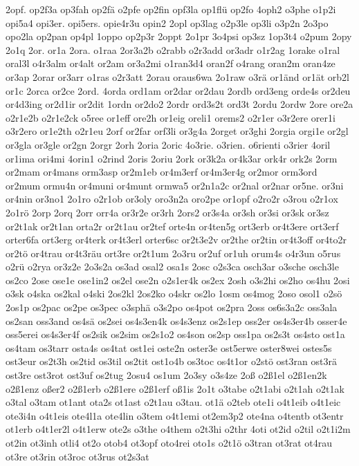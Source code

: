 {2opf.
op2f3a
op3fah
op2fä
o2pfe
op2fin
opf3la
op1flü
op2fo
4oph2
o3phe
o1p2i
opi5a4
opi3er.
opi5ers.
opie4r3u
opin2
2opl
op3lag
o2p3le
op3li
o3p2n
2o3po
opo2la
op2pan
op4pl
1oppo
op2p3r
2oppt
2o1pr
3o4psi
op3sz
1op3t4
o2pum
2opy
2o1q
2or.
or1a
2ora.
o1raa
2or3a2b
o2rabb
o2r3add
or3adr
o1r2ag
1orake
o1ral
oral3l
o4r3alm
or4alt
or2am
or3a2mi
o1ran3d4
oran2f
o4rang
oran2m
oran4ze
or3ap
2orar
or3arr
o1ras
o2r3att
2orau
oraus6wa
2o1raw
o3rä
or1änd
or1ät
orb2l
or1c
2orca
or2ce
2ord.
4orda
ord1am
or2dar
or2dau
2ordb
ord3eng
orde4s
or2deu
or4d3ing
or2d1ir
or2dit
1ordn
or2do2
2ordr
ord3s2t
ord3t
2ordu
2ordw
2ore
ore2a
o2r1e2b
o2r1e2ck
o5ree
or1eff
ore2h
or1eig
oreli1
orems2
o2r1er
o3r2ere
orer1i
o3r2ero
or1e2th
o2r1eu
2orf
or2far
orf3li
or3g4a
2orget
or3ghi
2orgia
orgi1e
or2gl
or3gla
or3gle
or2gn
2orgr
2orh
2oria
2oric
4o3rie.
o3rien.
o6rienti
o3rier
4oril
or1ima
ori4mi
4orin1
o2rind
2oris
2oriu
2ork
or3k2a
or4k3ar
ork4r
ork2s
2orm
or2mam
or4mans
orm3asp
or2m1eb
or4m3erf
or4m3er4g
or2mor
orm3ord
or2mum
ormu4n
or4muni
or4munt
ormwa5
or2n1a2c
or2nal
or2nar
or5ne.
or3ni
or4nin
or3no1
2o1ro
o2r1ob
or3oly
oro3n2a
oro2pe
or1opf
o2ro2r
o3rou
o2r1ox
2o1rö
2orp
2orq
2orr
orr4a
or3r2e
or3rh
2ors2
or3s4a
or3sh
or3si
or3sk
or3sz
or2t1ak
or2t1an
orta2r
or2t1au
or2tef
orte4n
or4ten5g
ort3erb
or4t3ere
ort3erf
orter6fa
ort3erg
or4terk
or4t3erl
orter6sc
or2t3e2v
or2the
or2tin
or4t3off
or4to2r
or2tö
or4trau
or4t3räu
ort3re
or2t1um
2o3ru
or2uf
or1uh
orum4s
o4r3un
o5rus
o2rü
o2rya
or3z2e
2o3s2a
os3ad
osal2
osa1s
2osc
o2s3ca
osch3ar
o3sche
osch3le
os2co
2ose
ose1e
ose1in2
os2el
ose2n
o2s1er4k
os2ex
2osh
o3s2hi
os2ho
os4hu
2osi
o3sk
o4ska
os2kal
o4ski
2os2kl
2os2ko
o4skr
os2lo
1osm
os4mog
2oso
osol1
o2sö
2os1p
os2pac
os2pe
os3pec
o3sphä
o3s2po
os4pot
os2pra
2oss
os6s3a2c
oss3ala
os2san
oss3and
os4sä
os2sei
os4s3en4k
os4s3enz
os2s1ep
oss2er
os4s3er4b
osser4e
oss5erei
os4s3er4f
os2sik
os2sim
os2s1o2
os4son
os2sp
oss1pa
os2s3t
os4sto
ost1a
os4tam
os3tarr
osta4s
os4tat
ost1ei
oste2n
oster3e
ost5erwe
oster8wei
ostes5s
ost3eur
os2t3h
os2tid
os3til
os2tit
ost1o4b
os3toc
os4t1or
o2stö
ost3ran
ost3rä
ost3re
ost3rot
ost3uf
os2tug
2osu4
os1um
2o3sy
o3s4ze
2oß
o2ß1el
o2ß1en2k
o2ß1enz
oßer2
o2ß1erb
o2ß1ere
o2ß1erf
oß1is
2o1t
o3tabe
o2t1abi
o2t1ah
o2t1ak
o3tal
o3tam
ot1ant
ota2s
ot1ast
o2t1au
o3tau.
ot1ä
o2teb
ote1i
o4t1eib
o4t1eic
ote3i4n
o4t1eis
ote4l1a
ote4lin
o3tem
o4t1emi
ot2em3p2
ote4na
o4tentb
ot3entr
ot1erb
o4t1er2l
o4t1erw
ote2s
o3the
o4them
o2t3hi
o2thr
4oti
ot2id
o2til
o2t1i2m
ot2in
ot3inh
otli4
ot2o
otob4
ot3opf
oto4rei
oto1s
o2t1ö
o3tran
ot3rat
ot4rau
ot3re
ot3rin
ot3roc
ot3rus
ot2s3at
}
